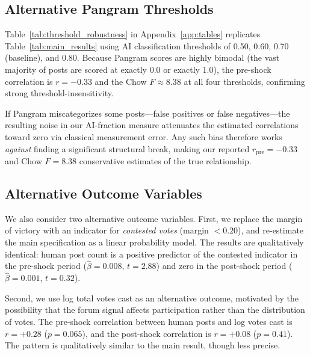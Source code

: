 \documentclass[12pt]{article}
\begin{document}
\subsection{Alternative Pangram Thresholds}

Table~\ref{tab:threshold_robustness} in Appendix~\ref{app:tables} replicates
Table~\ref{tab:main_results} using AI classification thresholds of 0.50, 0.60,
0.70 (baseline), and 0.80. Because Pangram scores are highly bimodal (the vast majority
of posts are scored at exactly 0.0 or exactly 1.0), the pre-shock correlation is
$r = -0.33$ and the Chow $F \approx 8.38$ at all four thresholds, confirming
strong threshold-insensitivity.

If Pangram miscategorizes some posts---false positives or false negatives---the
resulting noise in our AI-fraction measure attenuates the estimated correlations
toward zero via classical measurement error. Any such bias therefore works
\emph{against} finding a significant structural break, making our reported
$r_{\text{pre}} = -0.33$ and Chow $F = 8.38$ conservative estimates of the true
relationship.

\subsection{Alternative Outcome Variables}

We also consider two alternative outcome variables. First, we replace the margin
of victory with an indicator for \emph{contested votes} (margin $< 0.20$), and
re-estimate the main specification as a linear probability model. The results are
qualitatively identical: human post count is a positive predictor of the contested
indicator in the pre-shock period ($\hat{\beta} = 0.008$, $t = 2.88$) and zero
in the post-shock period ($\hat{\beta} = 0.001$, $t = 0.32$).

Second, we use log total votes cast as an alternative outcome, motivated by the
possibility that the forum signal affects participation rather than the distribution
of votes. The pre-shock correlation between human posts and log votes cast is
$r = +0.28$ ($p = 0.065$), and the post-shock correlation is $r = +0.08$
($p = 0.41$). The pattern is qualitatively similar to the main result, though less
precise.

\end{document}
